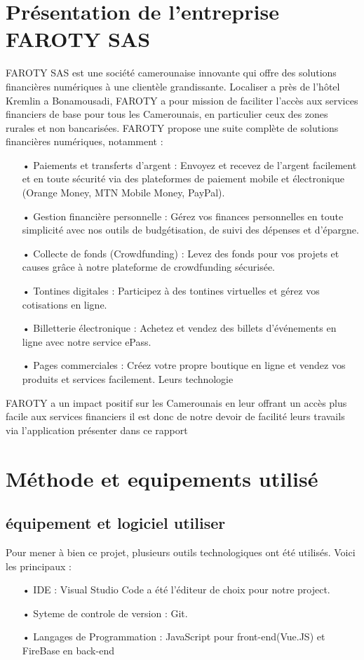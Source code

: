 \documentclass[a4paper,12pt]{report}
\begin{document}
\chapter{Présentation de l'entreprise FAROTY SAS} 
FAROTY SAS est une société camerounaise innovante qui offre des solutions financières numériques à une clientèle grandissante. Localiser a près de l’hôtel Kremlin a Bonamousadi, FAROTY a pour mission de faciliter l'accès aux services financiers de base pour tous les Camerounais, en particulier ceux des zones rurales et non bancarisées.
FAROTY propose une suite complète de solutions financières numériques, notamment :
\begin{itemize}
\item[•] Paiements et transferts d'argent : Envoyez et recevez de l'argent facilement et en toute sécurité via des plateformes de paiement mobile et électronique (Orange Money, MTN Mobile Money, PayPal). 
\item[•] Gestion financière personnelle : Gérez vos finances personnelles en toute simplicité avec nos outils de budgétisation, de suivi des dépenses et d'épargne. 
\item[•] Collecte de fonds (Crowdfunding) : Levez des fonds pour vos projets et causes grâce à notre plateforme de crowdfunding sécurisée. 
\item[•] Tontines digitales : Participez à des tontines virtuelles et gérez vos cotisations en ligne. 
\item[•] Billetterie électronique : Achetez et vendez des billets d'événements en ligne avec notre service ePass. 
\item[•] Pages commerciales : Créez votre propre boutique en ligne et vendez vos produits et services facilement. 
Leurs technologie
\end{itemize} 
FAROTY a un impact positif sur les Camerounais en leur offrant un accès plus facile aux services financiers il est donc de notre devoir de facilité leurs travails via l'application présenter dans ce rapport

\chapter{Méthode et equipements utilisé}
\section{équipement et logiciel utiliser}

Pour mener à bien ce projet, plusieurs outils technologiques ont été utilisés. Voici les principaux :
\begin{itemize}
\item[•] IDE : Visual Studio Code a été l'éditeur de choix pour notre project.
\item[•] Syteme de controle de version : Git.
\item[•] Langages de Programmation : JavaScript pour front-end(Vue.JS) et FireBase en back-end
\end{itemize}
\end{document}
